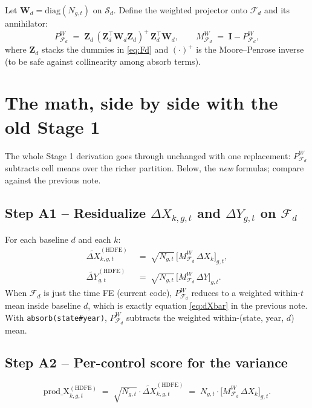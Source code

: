 \documentclass[11pt]{article}
\newcommand{\1}{\mathbb{1}}
\newcommand{\Smpl}{\mathcal{S}}
\newcommand{\Ngt}{N_{g,t}}
\newcommand{\dY}{\Delta Y_{g,t}}
\newcommand{\dXk}{\Delta X_{k,g,t}}
\newcommand{\PdW}{P^{\!W}_{\mathcal{F}_d}}
\newcommand{\MdW}{M^{\!W}_{\mathcal{F}_d}}
\begin{document}
\medskip\noindent
Let $\bm{W}_d = \mathrm{diag}(\Ngt)$ on $\Smpl_d$. Define the weighted
projector onto $\mathcal{F}_d$ and its annihilator:
\begin{equation}
\PdW \;=\; \bm{Z}_d\,(\bm{Z}_d^{\top}\bm{W}_d\bm{Z}_d)^{+}\,\bm{Z}_d^{\top}\bm{W}_d,
\qquad
\MdW \;=\; \bm{I} - \PdW,
\label{eq:proj}
\end{equation}
where $\bm{Z}_d$ stacks the dummies in \eqref{eq:Fd} and $(\cdot)^{+}$ is the
Moore--Penrose inverse (to be safe against collinearity among absorb terms).

\section{The math, side by side with the old Stage 1}

The whole Stage 1 derivation goes through unchanged with one replacement:
$\PdW$ subtracts cell means over the richer partition. Below, the
\emph{new} formulas; compare against the previous note.

\subsection*{Step A1 -- Residualize $\dXk$ and $\dY$ on $\mathcal{F}_d$}

For each baseline $d$ and each $k$:
\begin{align}
\widetilde{\Delta X}^{(\mathrm{HDFE})}_{k,g,t} &\;=\; \sqrt{\Ngt}\,\bigl[\MdW \,\Delta X_k\bigr]_{g,t}, \label{eq:resXnew}\\
\widetilde{\Delta Y}^{(\mathrm{HDFE})}_{g,t} &\;=\; \sqrt{\Ngt}\,\bigl[\MdW \,\Delta Y\bigr]_{g,t}. \label{eq:resYnew}
\end{align}
When $\mathcal{F}_d$ is just the time FE (current code), $\PdW$ reduces to a
weighted within-$t$ mean inside baseline $d$, which is exactly equation
\eqref{eq:dXbar} in the previous note. With \texttt{absorb(state\#year)},
$\PdW$ subtracts the weighted within-(state, year, $d$) mean.

\subsection*{Step A2 -- Per-control score for the variance}
\begin{equation}
\mathrm{prod\_X}_{k,g,t}^{(\mathrm{HDFE})} \;=\; \sqrt{\Ngt}\cdot\widetilde{\Delta X}^{(\mathrm{HDFE})}_{k,g,t}
\;=\; \Ngt\cdot \bigl[\MdW \,\Delta X_k\bigr]_{g,t}.
\label{eq:prodXnew}
\end{equation}
\end{document}
